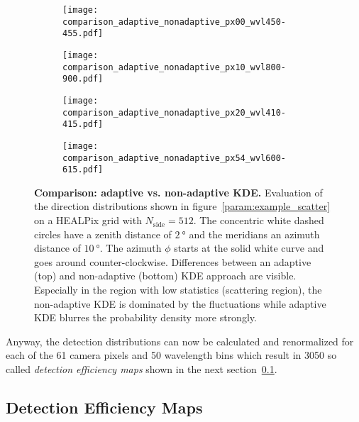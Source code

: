 \begin{figure}[h]
	\centering
	\begin{subfigure}[t]{0.40\textwidth}
		\texttt{[image: comparison\_adaptive\_nonadaptive\_px00\_wvl450-455.pdf]}
		\subcaption{}
		\label{param:kde_comparison:1}
	\end{subfigure}
	\hfill
	\begin{subfigure}[t]{0.40\textwidth}
		\texttt{[image: comparison\_adaptive\_nonadaptive\_px10\_wvl800-900.pdf]}
		\subcaption{}
		\label{param:kde_comparison:2}
	\end{subfigure}
	\vfill
	\begin{subfigure}[b]{0.40\textwidth}
		\texttt{[image: comparison\_adaptive\_nonadaptive\_px20\_wvl410-415.pdf]}
		\subcaption{}
		\label{param:kde_comparison:3}
	\end{subfigure}
	\hfill
	\begin{subfigure}[b]{0.40\textwidth}
		\texttt{[image: comparison\_adaptive\_nonadaptive\_px54\_wvl600-615.pdf]}
		\subcaption{}
		\label{param:kde_comparison:4}
	\end{subfigure}
	\caption[Comparison: adaptive vs. non-adaptive KDE]{\textbf{Comparison: adaptive vs. non-adaptive KDE.} Evaluation of the direction distributions shown in figure~\ref{param:example_scatter} on a HEALPix grid with $N_\text{side}=\num{512}$. The concentric white dashed circles have a zenith distance of $\SI{2}{\degree}$ and the meridians an azimuth distance of $\SI{10}{\degree}$. The azimuth $\phi$ starts at the solid white curve and goes around counter-clockwise. Differences between an adaptive (top) and non-adaptive (bottom) KDE approach are visible. Especially in the region with low statistics (scattering region), the non-adaptive KDE is dominated by the fluctuations while adaptive KDE blurres the probability density more strongly.}
	\label{param:kde_comparison}		
\end{figure}

Anyway, the detection distributions can now be calculated and renormalized for each of the \num{61} camera pixels and \num{50} wavelength bins which result in \num{3050} so called \textit{detection efficiency maps} shown in the next section~\ref{sec:deteff_maps}.

\subsection{Detection Efficiency Maps}\label{sec:deteff_maps}

